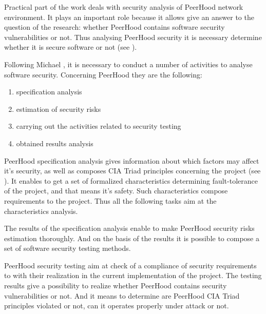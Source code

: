 %
Practical part of the work deals with security analysis of PeerHood network environment. 
%
It plays an important role because it allows give an answer to the question of the research: whether PeerHood contains software security vulnerabilities or not. 
%
Thus analysing PeerHood security it is necessary determine whether it is secure software or not (see ). 

%
Following Michael , it is necessary to conduct a number of activities to analyse software security. 
%
Concerning PeerHood they are the following: 
\begin{enumerate}
	\leftskip2em%
	\setlength{\itemsep}{0pt}%
	\setlength{\parsep}{0pt}%

	\item specification analysis
	\item estimation of security risks
	\item carrying out the activities related to security testing
	\item obtained results analysis
\end{enumerate}

%
PeerHood specification analysis gives information about which factors may affect it's security, as well as composes CIA Triad principles concerning the project (see ). 
%
It enables to get a set of formalized characteristics determining fault-tolerance of the project, and that means it's safety. 
%
Such characteristics compose requirements to the project. 
%
Thus all the following tasks aim at the characteristics analysis. 

%
The results of the specification analysis enable to make PeerHood security risks estimation thoroughly. 
%
And on the basis of the results it is possible to compose a set of software security testing methods. 

%
PeerHood security testing aim at check of a compliance of security requirements to with their realization in the current implementation of the project. 
%
The testing results give a possibility to realize whether PeerHood contains security vulnerabilities or not. 
%
And it means to determine are PeerHood CIA Triad principles violated or not, can it operates properly under attack or not. 
